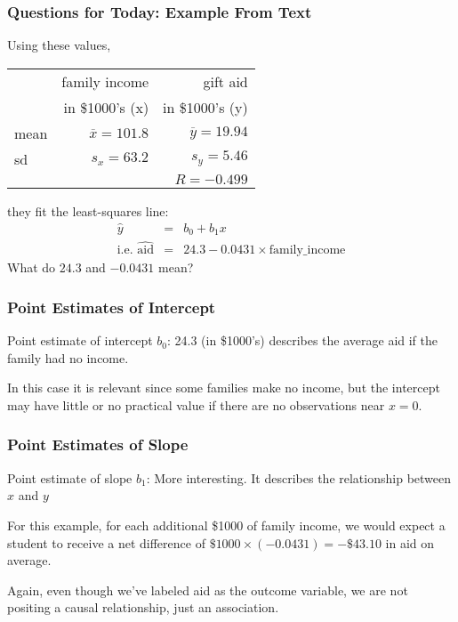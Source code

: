 \documentclass[slides]{beamer}
\newcommand{\blue}[1]{\textcolor{blue2}{#1}}
\begin{document}
\begin{frame}[fragile]
\frametitle{Questions for Today: Example From Text}
Using these values,
\begin{center}
\begin{tabular}{l|rr}
& family income & gift aid \\
& in \$1000's (x) & in \$1000's (y) \\ 
\hline
mean & $\overline{x}=101.8$ & $\overline{y}=19.94$ \\ 
sd & $s_x=63.2$ & $s_y=5.46$ \\ 
\hline
 &  & $R=-0.499$ \\ 
\hline
\end{tabular}
\end{center}
they fit the \blue{least-squares line}:
\pause
\begin{eqnarray*}
\widehat{y} &=& b_0 + b_1 x\\
\mbox{i.e. }\widehat{\mbox{aid}} &=& 24.3 - 0.0431 \times \mbox{family\_income}
\end{eqnarray*}
What do $24.3$ and $-0.0431$ mean?

\end{frame}


\begin{frame}[fragile]
\frametitle{Point Estimates of Intercept}
\blue{Point estimate of intercept $b_0$}: 24.3 (in \$1000's) describes the average aid if the family had no income.  

\vspace{0.25cm}
\pause
In this case it is relevant since some families make no income, but the intercept may have little or no practical value if there are no observations near $x=0$.  

\end{frame}


\begin{frame}[fragile]
\frametitle{Point Estimates of Slope}
\blue{Point estimate of slope $b_1$}: More interesting. It describes the \blue{relationship} between $x$ and $y$

\vspace{0.5cm}
\pause
For this example, for each additional \$1000 of family income, we would \blue{expect} a student to receive a net difference of $\$1000 \times (-0.0431) = -\$43.10$ in aid on average.   

\vspace{0.5cm}
\pause
Again, even though we've labeled aid as the outcome variable, we are not positing a causal relationship, just an association.  


\end{frame}
\end{document}
